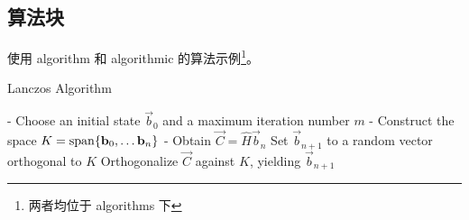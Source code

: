 \subsection{算法块}

使用 {algorithm} 和 {algorithmic} 的算法示例\footnote{两者均位于 \textsf{algorithms} 下}。

\begin{algorithm}[htbp]
    \caption{Lanczos Algorithm}
    \begin{algorithmic}
        \STATE - Choose an initial state $\vec{b}_0$ and a maximum iteration number $m$
        \STATE - Construct the space $K = \operatorname{span}\{\mathbf{b}_0 , \ldots \mathbf{b}_n \}$
        \STATE - Obtain $\vec{C} = \hat{H} \vec{b}_n$
        \STATE Set $\vec{b}_{n+1}$ to a random vector orthogonal to $K$
        \ELSE
        \STATE Orthogonalize $\vec{C}$ against $K$, yielding $\vec{b}_{n+1}$
        \ENDIF\ENDFOR
    \end{algorithmic}
\end{algorithm}
